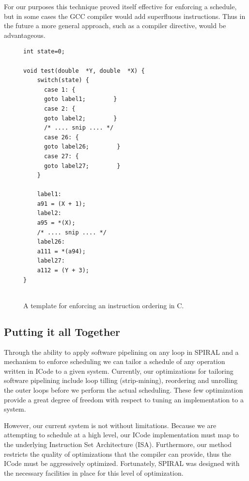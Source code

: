 \documentclass[10pt]{article}
\begin{document}
For our purposes this technique proved itself effective for enforcing a
schedule, but in some cases the GCC compiler would add superfluous instructions. Thus
in the future a more general approach, such as a compiler directive, would be
advantageous.


\begin{figure}[ht]
\begin{lstlisting}
int state=0;

void test(double  *Y, double  *X) {
    switch(state) {
      case 1: {
      goto label1;        }
      case 2: {
      goto label2;        }
      /* .... snip .... */
      case 26: {
      goto label26;        }
      case 27: {
      goto label27;        }
    }

    label1:
    a91 = (X + 1);
    label2:
    a95 = *(X);
    /* .... snip .... */
    label26:
    a111 = *(a94);
    label27:
    a112 = (Y + 3);
}


\end{lstlisting}
\caption{A template for enforcing an instruction ordering in C.}
\label{fig:force_sched}
\end{figure}


\subsection{Putting it all Together}

Through the ability to apply software pipelining on any loop in SPIRAL and a
mechanism to enforce scheduling we can tailor a schedule of any
operation written in ICode to a given system. Currently, our optimizations for
tailoring software pipelining include loop tilling (strip-mining), reordering and unrolling the
outer loops before we perform the actual scheduling. These few optimization
provide a great degree of freedom with respect to tuning an implementation to
a system.

However, our current system is not without limitations. Because we are
attempting to schedule at a high level, our ICode implementation must map to the
underlying Instruction Set Architecture (ISA). Furthermore, our method
restricts the quality of optimizations that the compiler can provide, thus the
ICode must be aggressively optimized. Fortunately, SPIRAL was designed with
the necessary facilities in place for this level of optimization.
\end{document}

